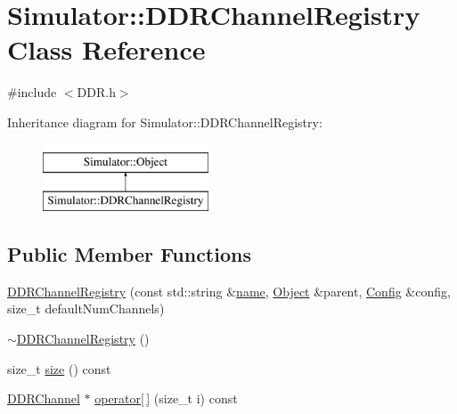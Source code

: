 \hypertarget{class_simulator_1_1_d_d_r_channel_registry}{\section{Simulator\+:\+:D\+D\+R\+Channel\+Registry Class Reference}
\label{class_simulator_1_1_d_d_r_channel_registry}
}


{\ttfamily \#include $<$D\+D\+R.\+h$>$}

Inheritance diagram for Simulator\+:\+:D\+D\+R\+Channel\+Registry\+:\begin{figure}[H]
\begin{center}
\leavevmode
\includegraphics[height=2.000000cm]{class_simulator_1_1_d_d_r_channel_registry}
\end{center}
\end{figure}
\subsection*{Public Member Functions}
\begin{DoxyCompactItemize}
\item 
\hyperlink{class_simulator_1_1_d_d_r_channel_registry_a500ef7dcbf386ab0608ee54656a2c92b}{D\+D\+R\+Channel\+Registry} (const std\+::string \&\hyperlink{mtconf_8c_a8f8f80d37794cde9472343e4487ba3eb}{name}, \hyperlink{class_simulator_1_1_object}{Object} \&parent, \hyperlink{class_config}{Config} \&config, size\+\_\+t default\+Num\+Channels)
\item 
\hyperlink{class_simulator_1_1_d_d_r_channel_registry_a26cae4cb88c6b53c0fb4176ffee0c615}{$\sim$\+D\+D\+R\+Channel\+Registry} ()
\item 
size\+\_\+t \hyperlink{class_simulator_1_1_d_d_r_channel_registry_a8f56980d7029bd4fa10a0a004cee96c2}{size} () const 
\item 
\hyperlink{class_simulator_1_1_d_d_r_channel}{D\+D\+R\+Channel} $\ast$ \hyperlink{class_simulator_1_1_d_d_r_channel_registry_aa57fb3c193fb088d89d8933adf9b03bf}{operator\mbox{[}$\,$\mbox{]}} (size\+\_\+t i) const 
\end{DoxyCompactItemize}


